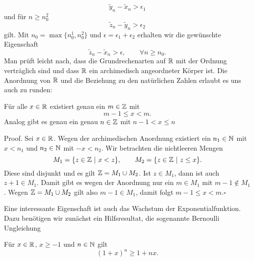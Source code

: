 \begin{equation*}
\tilde y_n - \tilde x_n > \epsilon_1
\end{equation*}
und für \(n\geq n_0^2\)
\begin{equation*}
\tilde z_n - \tilde y_n > \epsilon_2
\end{equation*}
gilt. Mit \(n_0=\max\{n_0^1,n_0^2\}\) und \(\epsilon = \epsilon_1 + \epsilon_2\) erhalten wir die gewünschte Eigenschaft
\begin{equation*}
\tilde z_n - \tilde x_n > \epsilon, \qquad \forall n \geq n_0.
\end{equation*}
Man prüft leicht nach, dass die Grundrechenarten auf \(\mathbb{R}\) mit der Ordnung verträglich sind und dass \(\mathbb{R}\) ein archimedisch angeordneter Körper ist. Die Anordnung von \(\mathbb{R}\) und die Beziehung zu den natürlichen Zahlen erlaubt es uns auch zu runden:
\label{grundlagen/zahlensysteme:lemma-19}
\begin{lemma}{}{}



Für alle \(x \in \mathbb{R}\) existiert genau ein \(m\in \mathbb{Z}\) mit
\begin{equation*}
 m-1 \leq x < m .
\end{equation*}
Analog gibt es genau ein genau \(n \in \mathbb{Z}\) mit \(n-1 < x \leq n\)
\end{lemma}

\begin{emphBox}{}{}
Proof. Sei \(x \in \mathbb{R}\). Wegen der archimedischen Anordnung existiert ein \(n_1 \in \mathbb{N}\) mit \(x < n_1\) und \(n_2 \in \mathbb{N}\) mit \(-x < n_2\). Wir betrachten die nichtleeren Mengen
\begin{equation*}
M_1 = \{ z \in \mathbb{Z}~|~ x < z\}, \qquad M_2 = \{ z \in \mathbb{Z}~|~ z \leq x\}.
\end{equation*}
Diese sind disjunkt und es gilt \(\mathbb{Z} = M_1 \cup M_2\). Ist \(z \in M_1\), dann ist auch \(z+1 \in M_1\). Damit gibt es wegen der Anordnung nur ein \(m \in M_1\) mit \(m-1 \notin M_1\). Wegen \(\mathbb{Z} = M_1 \cup M_2\) gilt also \(m-1 \in M_1\), damit folgt \(  m-1 \leq x < m . \square\)
\end{emphBox}

Eine interessante Eigenschaft ist auch das Wachstum der Exponentialfunktion. Dazu benötigen wir zunächst ein Hilfsresultat, die sogenannte Bernoulli Ungleichung
\label{grundlagen/zahlensysteme:lemma-20}
\begin{lemma}{}{}



Für \(x \in \mathbb{R}\), \(x \geq -1\) und \(n\in \mathbb{N}\) gilt
\begin{equation*}
 (1+x)^n \geq 1 + n x.
\end{equation*}\end{lemma}

